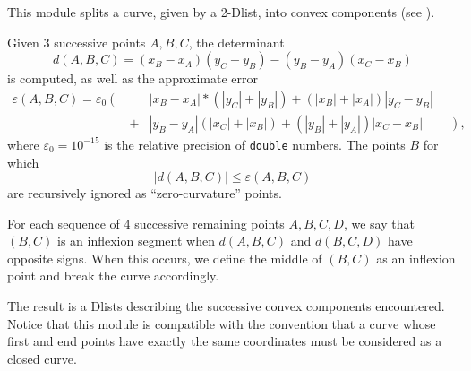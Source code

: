 This module splits a curve, given by a 2-Dlist, into convex components
(see \cite{lisani.monasse.ea:on}).

\medskip

Given 3 successive points $A,B,C$, the determinant
$$d(A,B,C) = (x_B-x_A)(y_C-y_B)-(y_B-y_A)(x_C-x_B)$$ 
is computed, as well as the approximate error
\begin{eqnarray*}
\varepsilon(A,B,C) = \varepsilon_0 \left( \frac{}{} \right. &\;& 
	|x_B-x_A|*(|y_C|+|y_B|) + (|x_B|+|x_A|)|y_C-y_B| \\
&+&	|y_B-y_A|(|x_C|+|x_B|)  + (|y_B|+|y_A|)|x_C-x_B| 
\qquad \left. \frac{}{} \right),
\end{eqnarray*}
where $\varepsilon_0 = 10^{-15}$ is the relative precision of 
\verb+double+ numbers.
The points $B$ for which 
$$|d(A,B,C)|\leq \varepsilon(A,B,C)$$ 
are recursively ignored as ``zero-curvature'' points.

\medskip

For each sequence of 4 successive remaining points $A,B,C,D$,
we say that $(B,C)$ is an inflexion
segment when $d(A,B,C)$ and $d(B,C,D)$ have opposite signs.
When this occurs, we define the middle of $(B,C)$ as an inflexion
point  and break the curve accordingly.

The result is a Dlists describing the successive convex components
encountered. Notice that this module is compatible with the convention
that a curve whose first and end points have exactly the same coordinates
must be considered as a closed curve.



